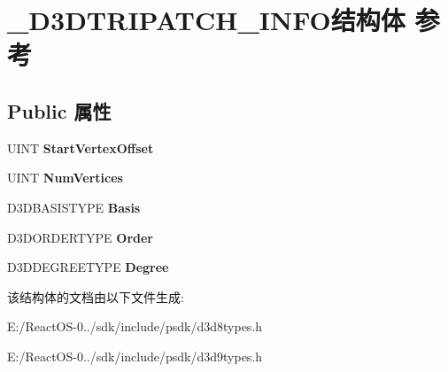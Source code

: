 \hypertarget{struct___d3_d_t_r_i_p_a_t_c_h___i_n_f_o}{}\section{\+\_\+\+D3\+D\+T\+R\+I\+P\+A\+T\+C\+H\+\_\+\+I\+N\+F\+O结构体 参考}
\label{struct___d3_d_t_r_i_p_a_t_c_h___i_n_f_o}
\subsection*{Public 属性}
\begin{DoxyCompactItemize}
\item 
\mbox{\label{struct___d3_d_t_r_i_p_a_t_c_h___i_n_f_o_a70222520d50a4aea28de22c90144a469}} 
U\+I\+NT {\bfseries Start\+Vertex\+Offset}
\item 
\mbox{\label{struct___d3_d_t_r_i_p_a_t_c_h___i_n_f_o_ae14f3bcc05a8b0cff35f43fe099c6bb8}} 
U\+I\+NT {\bfseries Num\+Vertices}
\item 
\mbox{\label{struct___d3_d_t_r_i_p_a_t_c_h___i_n_f_o_ac5ebae0d4ca734178f206c59dc7906c2}} 
D3\+D\+B\+A\+S\+I\+S\+T\+Y\+PE {\bfseries Basis}
\item 
\mbox{\label{struct___d3_d_t_r_i_p_a_t_c_h___i_n_f_o_a8dbc7011b8e72981e186cdf5388eefe2}} 
D3\+D\+O\+R\+D\+E\+R\+T\+Y\+PE {\bfseries Order}
\item 
\mbox{\label{struct___d3_d_t_r_i_p_a_t_c_h___i_n_f_o_a5ce412ad25f6db7010fd5b62b5933278}} 
D3\+D\+D\+E\+G\+R\+E\+E\+T\+Y\+PE {\bfseries Degree}
\end{DoxyCompactItemize}


该结构体的文档由以下文件生成\+:\begin{DoxyCompactItemize}
\item 
E\+:/\+React\+O\+S-\/0../sdk/include/psdk/d3d8types.\+h\item 
E\+:/\+React\+O\+S-\/0../sdk/include/psdk/d3d9types.\+h\end{DoxyCompactItemize}

